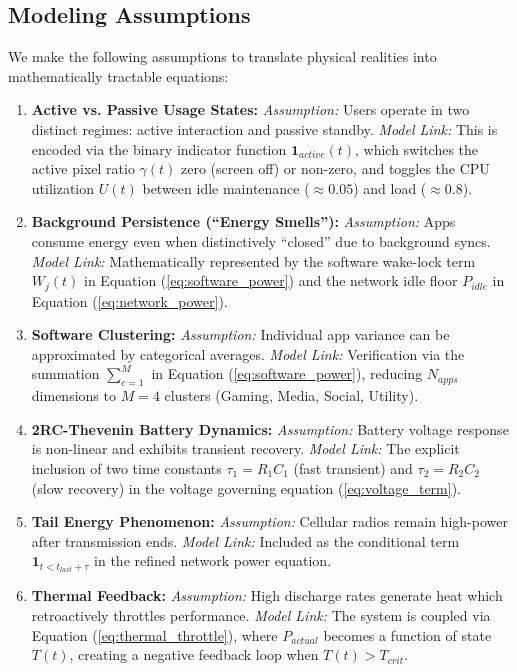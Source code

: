 \documentclass[12pt]{article}
\begin{document}
\subsection{Modeling Assumptions}

We make the following assumptions to translate physical realities into mathematically tractable equations:

\begin{enumerate}
    \item \textbf{Active vs. Passive Usage States:}
    \emph{Assumption:} Users operate in two distinct regimes: active interaction and passive standby.
    \emph{Model Link:} This is encoded via the binary indicator function $\mathbf{1}_{active}(t)$, which switches the active pixel ratio $\gamma(t)$ zero (screen off) or non-zero, and toggles the CPU utilization $U(t)$ between idle maintenance ($\approx 0.05$) and load ($\approx 0.8$).
    
    \item \textbf{Background Persistence (``Energy Smells''):}
    \emph{Assumption:} Apps consume energy even when distinctively ``closed'' due to background syncs.
    \emph{Model Link:} Mathematically represented by the software wake-lock term $W_j(t)$ in Equation (\ref{eq:software_power}) and the network idle floor $P_{idle}$ in Equation (\ref{eq:network_power}).
    
    \item \textbf{Software Clustering:}
    \emph{Assumption:} Individual app variance can be approximated by categorical averages.
    \emph{Model Link:} Verification via the summation $\sum_{c=1}^{M}$ in Equation (\ref{eq:software_power}), reducing $N_{apps}$ dimensions to $M=4$ clusters (Gaming, Media, Social, Utility).
    
    \item \textbf{2RC-Thevenin Battery Dynamics:}
    \emph{Assumption:} Battery voltage response is non-linear and exhibits transient recovery.
    \emph{Model Link:} The explicit inclusion of two time constants $\tau_1 = R_1 C_1$ (fast transient) and $\tau_2 = R_2 C_2$ (slow recovery) in the voltage governing equation (\ref{eq:voltage_term}).
    
    \item \textbf{Tail Energy Phenomenon:}
    \emph{Assumption:} Cellular radios remain high-power after transmission ends.
    \emph{Model Link:} Included as the conditional term $\mathbf{1}_{t < t_{last} + \tau}$ in the refined network power equation.
    
    \item \textbf{Thermal Feedback:}
    \emph{Assumption:} High discharge rates generate heat which retroactively throttles performance.
    \emph{Model Link:} The system is coupled via Equation (\ref{eq:thermal_throttle}), where $P_{actual}$ becomes a function of state $T(t)$, creating a negative feedback loop when $T(t) > T_{crit}$.
\end{enumerate}
\end{document}
